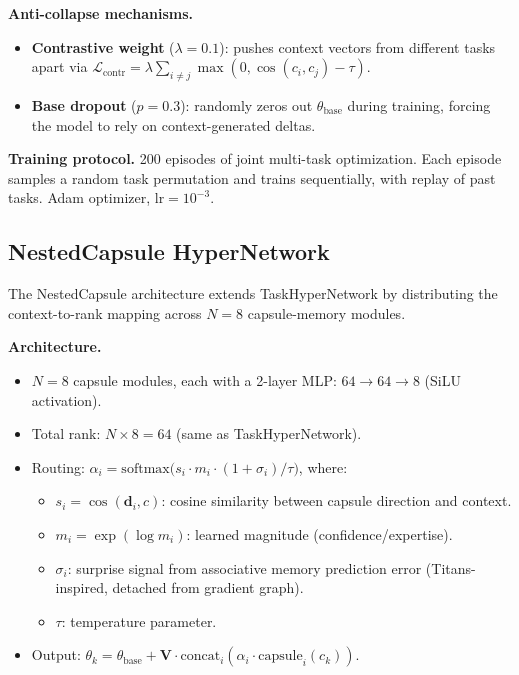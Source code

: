 \documentclass{article}
\begin{document}
\textbf{Anti-collapse mechanisms.}
\begin{itemize}
    \item \textbf{Contrastive weight} ($\lambda = 0.1$): pushes context vectors from different tasks apart via $\mathcal{L}_\mathrm{contr} = \lambda \sum_{i \neq j} \max(0, \cos(c_i, c_j) - \tau)$.
    \item \textbf{Base dropout} ($p = 0.3$): randomly zeros out $\theta_\mathrm{base}$ during training, forcing the model to rely on context-generated deltas.
\end{itemize}

\textbf{Training protocol.}
200 episodes of joint multi-task optimization. Each episode samples a random task permutation and trains sequentially, with replay of past tasks. Adam optimizer, $\mathrm{lr} = 10^{-3}$.


\subsection{NestedCapsule HyperNetwork}
\label{app:nested_capsule}

The NestedCapsule architecture extends TaskHyperNetwork by distributing the context-to-rank mapping across $N=8$ capsule-memory modules.

\textbf{Architecture.}
\begin{itemize}
    \item $N = 8$ capsule modules, each with a 2-layer MLP: $64 \to 64 \to 8$ (SiLU activation).
    \item Total rank: $N \times 8 = 64$ (same as TaskHyperNetwork).
    \item Routing: $\alpha_i = \mathrm{softmax}\bigl(s_i \cdot m_i \cdot (1 + \sigma_i) / \tau\bigr)$, where:
    \begin{itemize}
        \item $s_i = \cos(\mathbf{d}_i, c)$: cosine similarity between capsule direction and context.
        \item $m_i = \exp(\log m_i)$: learned magnitude (confidence/expertise).
        \item $\sigma_i$: surprise signal from associative memory prediction error (Titans-inspired, detached from gradient graph).
        \item $\tau$: temperature parameter.
    \end{itemize}
    \item Output: $\theta_k = \theta_\mathrm{base} + \mathbf{V} \cdot \mathrm{concat}_i(\alpha_i \cdot \mathrm{capsule}_i(c_k))$.
\end{itemize}
\end{document}
